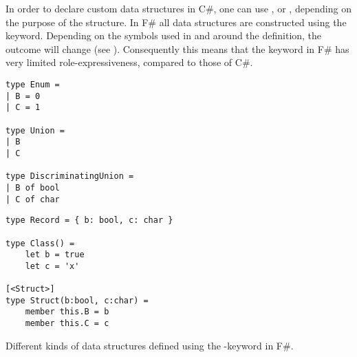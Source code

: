 In order to declare custom data structures in C\#, one can use ,  or , depending on the purpose of the structure. In F\# all data structures are constructed using the  keyword. Depending on the symbols used in and around the definition, the outcome will change (see ). Consequently this means that the  keyword in F\# has very limited role-expressiveness, compared to those of C\#.

\begin{listing}[H]
    \begin{minipage}{.45\textwidth}
        \begin{verbatim}
type Enum =
| B = 0
| C = 1

type Union =
| B
| C

type DiscriminatingUnion =
| B of bool
| C of char
        \end{verbatim}
    \end{minipage}
    \hfill
    \begin{minipage}{.45\textwidth}
        \begin{verbatim}
type Record = { b: bool, c: char }

type Class() =
    let b = true
    let c = 'x'

[<Struct>]
type Struct(b:bool, c:char) =
    member this.B = b
    member this.C = c
        \end{verbatim}
    \end{minipage}
\caption{Different kinds of data structures defined using the -keyword in F\#.}
\label{lst:fsharp:type}
\end{listing}